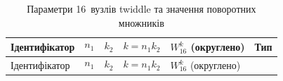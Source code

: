 \documentclass[
]{article}
\begin{document}
\begin{longtable}[]{@{}
  >{\raggedright\arraybackslash}p{}
  >{\raggedright\arraybackslash}p{}
  >{\raggedright\arraybackslash}p{}
  >{\raggedright\arraybackslash}p{}
  >{\raggedright\arraybackslash}p{}
  >{\raggedright\arraybackslash}p{}@{}}
\caption[Параметри 16~вузлів twiddle та значення поворотних
множників]{Параметри 16~вузлів twiddle та значення поворотних
множників}\tabularnewline
\toprule\noalign{}
\begin{minipage}[b]{\linewidth}\raggedright
Ідентифікатор
\end{minipage} & \begin{minipage}[b]{\linewidth}\raggedright
\[n_{1}\]
\end{minipage} & \begin{minipage}[b]{\linewidth}\raggedright
\[k_{2}\]
\end{minipage} & \begin{minipage}[b]{\linewidth}\raggedright
\[k = n_{1}k_{2}\]
\end{minipage} & \begin{minipage}[b]{\linewidth}\raggedright
\(W_{16}^{k}\) (округлено)
\end{minipage} & \begin{minipage}[b]{\linewidth}\raggedright
Тип
\end{minipage} \\
\midrule\noalign{}
\endfirsthead
\toprule\noalign{}
\begin{minipage}[b]{\linewidth}\raggedright
Ідентифікатор
\end{minipage} & \begin{minipage}[b]{\linewidth}\raggedright
\[n_{1}\]
\end{minipage} & \begin{minipage}[b]{\linewidth}\raggedright
\[k_{2}\]
\end{minipage} & \begin{minipage}[b]{\linewidth}\raggedright
\[k = n_{1}k_{2}\]
\end{minipage} & \begin{minipage}[b]{\linewidth}\raggedright
\(W_{16}^{k}\) (округлено)
\end{minipage} & \begin{minipage}[b]{\linewidth}\raggedright

\end{minipage}
\end{longtable}
\end{document}
